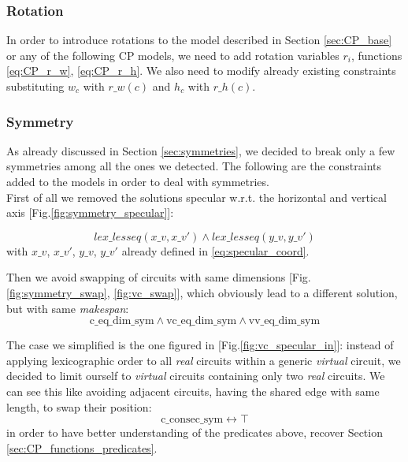 
\subsubsection{Rotation}

In order to introduce rotations to the model described in Section \ref{sec:CP_base} or any 
of the following CP models, we need to add rotation variables $r_i$, functions \ref{eq:CP_r_w}, \ref{eq:CP_r_h}. We
also need to modify already existing constraints substituting $w_c$ with $r\_w(c)$ and $h_c$ with $r\_h(c)$.

\subsubsection{Symmetry}

As already discussed in Section \ref{sec:symmetries}, we decided to break only a few symmetries among all the ones we
detected. The following are the constraints added to the models in order to deal with symmetries.\\

First of all we removed the solutions specular w.r.t. the horizontal and vertical axis [Fig.\ref{fig:symmetry_specular}]:

\begin{equation*}
  lex\_lesseq(x\_v, x\_v') \land lex\_lesseq(y\_v, y\_v')
\end{equation*}
with $x\_v$, $x\_v'$, $y\_v$, $y\_v'$ already defined in \ref{eq:specular_coord}.

Then we avoid swapping of circuits with same dimensions [Fig.\ref{fig:symmetry_swap}, \ref{fig:vc_swap}],
which obviously lead to a different solution, but with same \textit{makespan}:
\begin{equation*}
  \text{c\_eq\_dim\_sym} \land \text{vc\_eq\_dim\_sym} \land \text{vv\_eq\_dim\_sym}
\end{equation*}

The case we simplified is the one figured in [Fig.\ref{fig:vc_specular_in}]: instead of applying
lexicographic order to all \textit{real} circuits within a generic \textit{virtual} circuit, we
decided to limit ourself to \textit{virtual} circuits containing only two \textit{real} circuits.
We can see this like avoiding adjacent circuits, having the shared edge with same length,
to swap their position:
\begin{equation*}
  \text{c\_consec\_sym} \leftrightarrow \top
\end{equation*}
in order to have better understanding of the predicates above, recover Section \ref{sec:CP_functions_predicates}.


